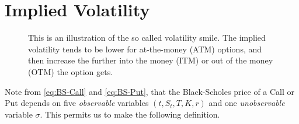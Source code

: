 \documentclass[12pt]{book}
\numberwithin{equation}{chapter}
\theoremstyle{plain}
\numberwithin{theorem}{section}
\theoremstyle{definition}
\numberwithin{exercise}{chapter}
\newcommand{\<}{\langle}
\renewcommand{\>}{\rangle}
\renewcommand{\(}{\left(}
\renewcommand{\)}{\right)}
\renewcommand{\[}{\left[}
\renewcommand{\]}{\right]}
\newcommand\sig{\sigma}
\theoremstyle{definition}
\numberwithin{question}{section}
\begin{document}
\section{Implied Volatility}

\begin{figure}[hb!]
\centering
{}
\caption{This is an illustration of the so called volatility smile. The implied volatility tends to be lower for at-the-money (ATM) options, and then increase the further into the money (ITM) or out of the money (OTM) the option gets. \label{fig:plot2_5}}
\end{figure}

\noindent
Note from \eqref{eq:BS-Call} and \eqref{eq:BS-Put}, that the Black-Scholes price of a Call or Put depends on five \textit{observable} variables $(t,S_t,T,K,r)$ and one \textit{unobservable} variable $\sig$.  This permits us to make the following definition.
\end{document}

